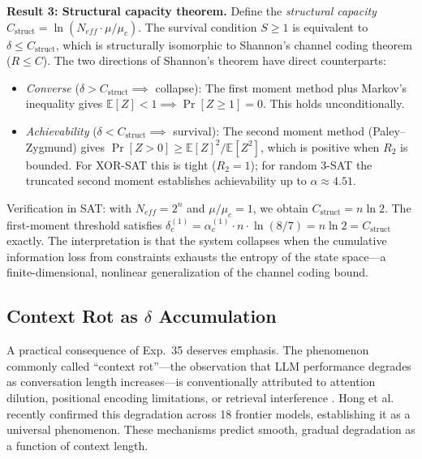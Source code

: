 \documentclass[11pt,a4paper]{article}
\begin{document}
\textbf{Result 3: Structural capacity theorem.} Define the \emph{structural capacity} $C_{\text{struct}} = \ln(N_{eff} \cdot \mu/\mu_c)$. The survival condition $S \geq 1$ is equivalent to $\delta \leq C_{\text{struct}}$, which is structurally isomorphic to Shannon's channel coding theorem ($R \leq C$). The two directions of Shannon's theorem have direct counterparts:

\begin{itemize}
    \item \emph{Converse} ($\delta > C_{\text{struct}} \implies$ collapse): The first moment method plus Markov's inequality gives $\mathbb{E}[Z] < 1 \implies \Pr[Z \geq 1] = 0$. This holds unconditionally.

    \item \emph{Achievability} ($\delta < C_{\text{struct}} \implies$ survival): The second moment method (Paley--Zygmund) gives $\Pr[Z > 0] \geq \mathbb{E}[Z]^2/\mathbb{E}[Z^2]$, which is positive when $R_2$ is bounded. For XOR-SAT this is tight ($R_2 = 1$); for random 3-SAT the truncated second moment establishes achievability up to $\alpha \approx 4.51$.
\end{itemize}

\noindent Verification in SAT: with $N_{eff} = 2^n$ and $\mu/\mu_c = 1$, we obtain $C_{\text{struct}} = n \ln 2$. The first-moment threshold satisfies $\delta_c^{(1)} = \alpha_c^{(1)} \cdot n \cdot \ln(8/7) = n \ln 2 = C_{\text{struct}}$ exactly. The interpretation is that the system collapses when the cumulative information loss from constraints exhausts the entropy of the state space---a finite-dimensional, nonlinear generalization of the channel coding bound.

\subsection{Context Rot as $\delta$ Accumulation}
\label{sec:context-rot}

A practical consequence of Exp.~35 deserves emphasis. The phenomenon commonly called ``context rot''---the observation that LLM performance degrades as conversation length increases---is conventionally attributed to attention dilution, positional encoding limitations, or retrieval interference \citep{liu2024}. Hong et al.\ \citep{hong2025contextrot} recently confirmed this degradation across 18 frontier models, establishing it as a universal phenomenon. These mechanisms predict smooth, gradual degradation as a function of context length.
\end{document}
